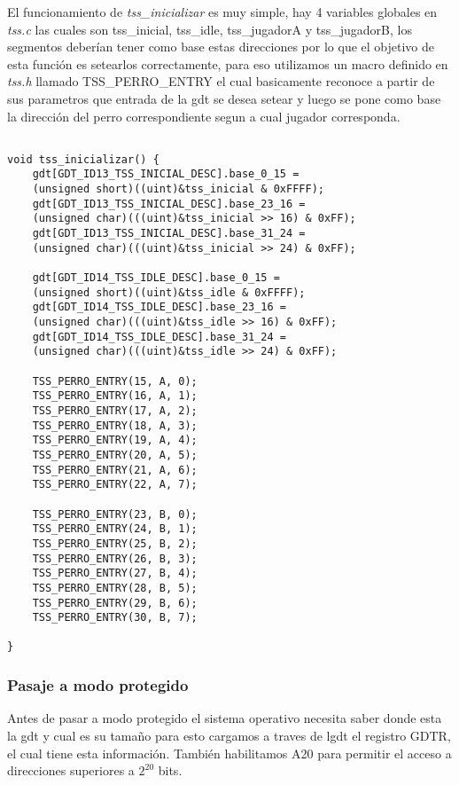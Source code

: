El funcionamiento de \textit{tss\_inicializar} es muy simple, hay 4 variables globales en \textit{tss.c} las cuales son tss\_inicial, tss\_idle, tss\_jugadorA y tss\_jugadorB, los segmentos deberían tener como base estas direcciones por lo que el objetivo de esta función es setearlos correctamente, para eso utilizamos un macro definido en \textit{tss.h} llamado TSS\_PERRO\_ENTRY el cual basicamente reconoce a partir de sus parametros que entrada de la gdt se desea setear y luego se pone como base la dirección del perro correspondiente segun a cual jugador corresponda.

\begin{lstlisting}

void tss_inicializar() {
	gdt[GDT_ID13_TSS_INICIAL_DESC].base_0_15 = 
	(unsigned short)((uint)&tss_inicial & 0xFFFF);
	gdt[GDT_ID13_TSS_INICIAL_DESC].base_23_16 = 
	(unsigned char)(((uint)&tss_inicial >> 16) & 0xFF);
	gdt[GDT_ID13_TSS_INICIAL_DESC].base_31_24 = 
	(unsigned char)(((uint)&tss_inicial >> 24) & 0xFF);

	gdt[GDT_ID14_TSS_IDLE_DESC].base_0_15 = 
	(unsigned short)((uint)&tss_idle & 0xFFFF);
	gdt[GDT_ID14_TSS_IDLE_DESC].base_23_16 = 
	(unsigned char)(((uint)&tss_idle >> 16) & 0xFF);
	gdt[GDT_ID14_TSS_IDLE_DESC].base_31_24 = 
	(unsigned char)(((uint)&tss_idle >> 24) & 0xFF);

	TSS_PERRO_ENTRY(15, A, 0);
	TSS_PERRO_ENTRY(16, A, 1);
	TSS_PERRO_ENTRY(17, A, 2);
	TSS_PERRO_ENTRY(18, A, 3);
	TSS_PERRO_ENTRY(19, A, 4);
	TSS_PERRO_ENTRY(20, A, 5);
	TSS_PERRO_ENTRY(21, A, 6);
	TSS_PERRO_ENTRY(22, A, 7);

	TSS_PERRO_ENTRY(23, B, 0);
	TSS_PERRO_ENTRY(24, B, 1);
	TSS_PERRO_ENTRY(25, B, 2);
	TSS_PERRO_ENTRY(26, B, 3);
	TSS_PERRO_ENTRY(27, B, 4);
	TSS_PERRO_ENTRY(28, B, 5);
	TSS_PERRO_ENTRY(29, B, 6);
	TSS_PERRO_ENTRY(30, B, 7);

}

\end{lstlisting}

\subsubsection{Pasaje a modo protegido}

Antes de pasar a modo protegido el sistema operativo necesita saber donde esta la gdt y cual es su tamaño para esto cargamos a traves de lgdt el registro GDTR, el cual tiene esta información. También habilitamos A20 para permitir el acceso a direcciones superiores a $2^{20}$ bits.


